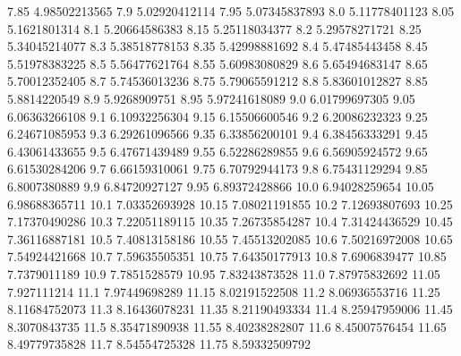            7.85    4.98502213565
            7.9    5.02920412114
           7.95    5.07345837893
            8.0    5.11778401123
           8.05     5.1621801314
            8.1    5.20664586383
           8.15    5.25118034377
            8.2    5.29578271721
           8.25    5.34045214077
            8.3    5.38518778153
           8.35    5.42998881692
            8.4    5.47485443458
           8.45    5.51978383225
            8.5    5.56477621764
           8.55    5.60983080829
            8.6    5.65494683147
           8.65    5.70012352405
            8.7    5.74536013236
           8.75    5.79065591212
            8.8    5.83601012827
           8.85     5.8814220549
            8.9     5.9268909751
           8.95    5.97241618089
            9.0    6.01799697305
           9.05    6.06363266108
            9.1    6.10932256304
           9.15    6.15506600546
            9.2    6.20086232323
           9.25    6.24671085953
            9.3    6.29261096566
           9.35    6.33856200101
            9.4    6.38456333291
           9.45    6.43061433655
            9.5    6.47671439489
           9.55    6.52286289855
            9.6    6.56905924572
           9.65    6.61530284206
            9.7    6.66159310061
           9.75    6.70792944173
            9.8    6.75431129294
           9.85     6.8007380889
            9.9    6.84720927127
           9.95    6.89372428866
           10.0    6.94028259654
          10.05    6.98688365711
           10.1    7.03352693928
          10.15    7.08021191855
           10.2    7.12693807693
          10.25    7.17370490286
           10.3    7.22051189115
          10.35    7.26735854287
           10.4    7.31424436529
          10.45    7.36116887181
           10.5    7.40813158186
          10.55    7.45513202085
           10.6    7.50216972008
          10.65    7.54924421668
           10.7    7.59635505351
          10.75    7.64350177913
           10.8     7.6906839477
          10.85     7.7379011189
           10.9     7.7851528579
          10.95    7.83243873528
           11.0    7.87975832692
          11.05      7.927111214
           11.1    7.97449698289
          11.15    8.02191522508
           11.2    8.06936553716
          11.25    8.11684752073
           11.3    8.16436078231
          11.35    8.21190493334
           11.4    8.25947959006
          11.45     8.3070843735
           11.5    8.35471890938
          11.55    8.40238282807
           11.6    8.45007576454
          11.65    8.49779735828
           11.7    8.54554725328
          11.75    8.59332509792
